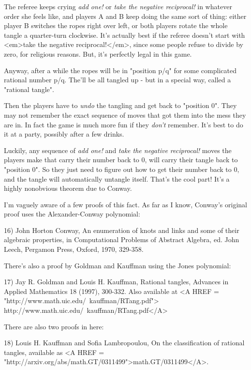 The referee keeps crying \emph{add one!}
or \emph{take the negative reciprocal!}
in whatever order she feels like, and players A and B keep doing the
same sort of thing: either player B switches the ropes right over left,
or both players rotate the whole tangle a quarter-turn clockwise.  It's
actually best if the referee doesn't start with <em>take the negative
reciprocal!</em>, since some people refuse to divide by zero, for religious
reasons.  But, it's perfectly legal in this game.

Anyway, after a while the ropes will be 
in "position p/q" for some complicated rational number p/q.  
The'll be all tangled up - but in a special way, called a 
"rational tangle".

Then the players have to \emph{undo} 
the tangling and get back to "position 0".
They may not remember the exact sequence of moves that got them into
the mess they are in.  In fact the game is much more fun if they 
\emph{don't}
remember.  It's best to do it at a party, possibly after a few drinks.

Luckily, any sequence of \emph{add one!} and 
\emph{take the negative reciprocal!} moves the players
make that carry their number back to 0, will carry their tangle back 
to "position 0".  So they just need to figure out how to get their 
number back to 0, and the tangle will automatically untangle itself.  
That's the cool part!  It's a highly nonobvious theorem due to Conway.

I'm vaguely aware of a few proofs of this fact.  As far as I know, 
Conway's original proof uses the Alexander-Conway polynomial:

16) John Horton Conway, An enumeration of knots and links and some
of their algebraic properties, in Computational Problems of Abstract
Algebra, ed. John Leech, Pergamon Press, Oxford, 1970, 329-358.

There's also a proof by Goldman and Kauffman using the Jones polynomial:

17) Jay R. Goldman and Louis H. Kauffman, Rational tangles, Advances in 
Applied Mathematics 18 (1997), 300-332.  Also available at 
<A HREF = "http://www.math.uic.edu/~kauffman/RTang.pdf">
http://www.math.uic.edu/~kauffman/RTang.pdf</A>

There are also two proofs in here:

18) Louis H. Kauffman and Sofia Lambropoulou, On the classification of
rational tangles, available as 
<A HREF = "http://arxiv.org/abs/math.GT/0311499">math.GT/0311499</A>.
 
